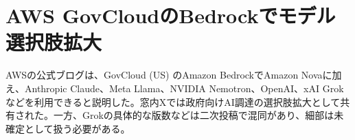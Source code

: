 \section{AWS GovCloudのBedrockでモデル選択肢拡大}
AWSの公式ブログは、GovCloud (US) のAmazon BedrockでAmazon Novaに加え、Anthropic Claude、Meta Llama、NVIDIA Nemotron、OpenAI、xAI Grokなどを利用できると説明した。窓内Xでは政府向けAI調達の選択肢拡大として共有された。一方、Grokの具体的な版数などは二次投稿で混同があり、細部は未確定として扱う必要がある。
